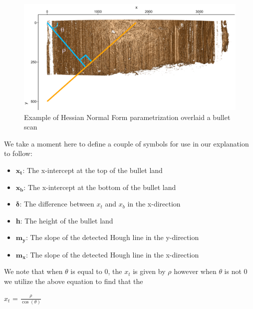 \documentclass[12pt]{article}\usepackage[]{graphicx}\usepackage[]{color}
\newenvironment{knitrout}{}{} %
\theoremstyle{nonumberplain}
\begin{document}
\begin{knitrout}
\color{fgcolor}\begin{figure}[H]

{\centering \includegraphics[width=0.8\linewidth]{../images/hessian-example} 

}

\caption[Example of Hessian Normal Form parametrization overlaid a bullet scan]{Example of Hessian Normal Form parametrization overlaid a bullet scan}\label{fig:hessian-graphic-inclusion}
\end{figure}


\end{knitrout}

We take a moment here to define a couple of symbols for use in our explanation to follow:
\begin{itemize}
  \item $\mathbf{x_{t}}$: The x-intercept at the top of the bullet land \\
  \item $\mathbf{x_{b}}$: The x-intercept at the bottom of the bullet land \\
  \item $\boldsymbol\delta$: The difference between $x_t$ and $x_b$ in the x-direction \\
  \item \textbf{h}: The height of the bullet land \\
  \item $\mathbf{m_y}$: The slope of the detected Hough line in the y-direction \\
  \item $\mathbf{m_x}$: The slope of the detected Hough line in the x-direction \\
\end{itemize}
We note that when $\theta$ is equal to 0, the $x_t$ is given by $\rho$ however when $\theta$ is not 0 we utilize the above equation to find that the 
\begin{center}
$x_t$ = $\frac{\rho}{\cos(\theta)}$
\end{center}
\end{document}
